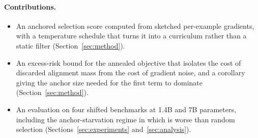\paragraph{Contributions.}
\begin{itemize}
  \item An anchored selection score computed from sketched per-example
        gradients, with a temperature schedule that turns it into a curriculum
        rather than a static filter (Section~\ref{sec:method}).
  \item An excess-risk bound for the annealed objective that isolates the cost
        of discarded alignment mass from the cost of gradient noise, and a
        corollary giving the anchor size needed for the first term to dominate
        (Section~\ref{sec:method}).
  \item An evaluation on four shifted benchmarks at 1.4B and 7B parameters,
        including the anchor-starvation regime in which \method{} is worse than
        random selection (Sections~\ref{sec:experiments}
        and~\ref{sec:analysis}).
\end{itemize}
